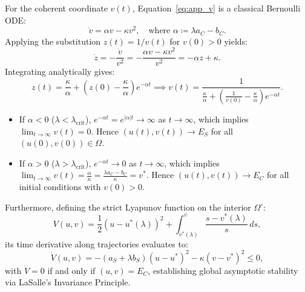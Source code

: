 \documentclass{article}
\theoremstyle{plain}
\theoremstyle{definition}
\begin{document}
For the coherent coordinate $v(t)$, Equation~\eqref{eq:app_v} is a classical Bernoulli ODE:
\begin{equation}
    \dot{v} = \alpha v - \kappa v^2, \quad \text{where } \alpha \coloneqq \lambda a_C - b_C.
\end{equation}
Applying the substitution $z(t) = 1 / v(t)$ for $v(0) > 0$ yields:
\begin{equation}
    \dot{z} = -\frac{\dot{v}}{v^2} = -\frac{\alpha v - \kappa v^2}{v^2} = -\alpha z + \kappa.
\end{equation}
Integrating analytically gives:
\begin{equation}
    z(t) = \frac{\kappa}{\alpha} + \left( z(0) - \frac{\kappa}{\alpha} \right) e^{-\alpha t} \implies v(t) = \frac{1}{\frac{\kappa}{\alpha} + \left( \frac{1}{v(0)} - \frac{\kappa}{\alpha} \right) e^{-\alpha t}}.
\end{equation}
\begin{itemize}
    \item If $\alpha < 0$ ($\lambda < \lambda_{\text{crit}}$), $e^{-\alpha t} = e^{|\alpha| t} \to \infty$ as $t \to \infty$, which implies $\lim_{t \to \infty} v(t) = 0$. Hence $(u(t), v(t)) \to E_S$ for all $(u(0), v(0)) \in \Omega$.
    \item If $\alpha > 0$ ($\lambda > \lambda_{\text{crit}}$), $e^{-\alpha t} \to 0$ as $t \to \infty$, which implies $\lim_{t \to \infty} v(t) = \frac{\alpha}{\kappa} = \frac{\lambda a_C - b_C}{\kappa} = v^*$. Hence $(u(t), v(t)) \to E_C$ for all initial conditions with $v(0) > 0$.
\end{itemize}

Furthermore, defining the strict Lyapunov function on the interior $\Omega^\circ$:
\begin{equation}
    V(u, v) = \frac{1}{2} (u - u^*(\lambda))^2 + \int_{v^*(\lambda)}^v \frac{s - v^*(\lambda)}{s} \, ds,
\end{equation}
its time derivative along trajectories evaluates to:
\begin{equation}
    \dot{V}(u, v) = -(a_S + \lambda b_S)(u - u^*)^2 - \kappa (v - v^*)^2 \le 0,
\end{equation}
with $\dot{V} = 0$ if and only if $(u, v) = E_C$, establishing global asymptotic stability via LaSalle's Invariance Principle.
\end{document}
